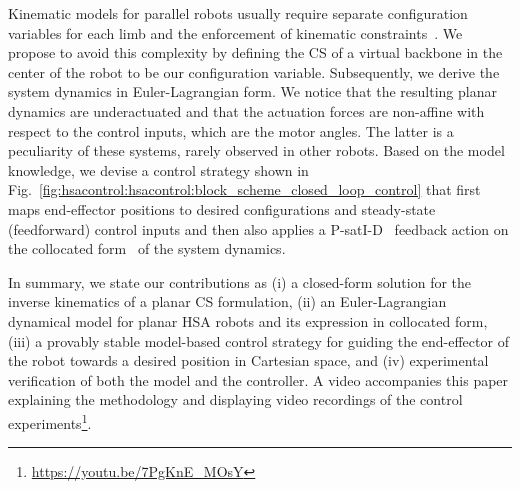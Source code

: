 Kinematic models for parallel robots usually require separate configuration variables for each limb and the enforcement of kinematic constraints~\cite {armanini2021discrete}.
%
We propose to avoid this complexity by %
defining the \gls{CS} of a virtual backbone in the center of the robot to be our configuration variable. %
Subsequently, we derive the system dynamics in Euler-Lagrangian form. We notice that the resulting planar dynamics are underactuated
and that the actuation forces are non-affine with respect to the control inputs, which are the motor angles. The latter is a peculiarity of these systems, rarely observed in other robots.
Based on the model knowledge, we devise a control strategy shown in Fig.~\ref{fig:hsacontrol:hsacontrol:block_scheme_closed_loop_control} that first maps end-effector positions to desired configurations and steady-state (feedforward) control inputs and then 
also applies a P-satI-D~\cite{pustina2022p} feedback action on the collocated form~\cite{pustina2024input} of the system dynamics.

In summary, we state our contributions as (i) a closed-form solution for the inverse kinematics of a planar \gls{CS} formulation, (ii) an Euler-Lagrangian dynamical model for planar \gls{HSA} robots and its expression in collocated form, (iii) a provably stable model-based control strategy for guiding the end-effector of the robot towards a desired position in Cartesian space, and (iv) experimental verification of both the model and the controller. A video accompanies this paper explaining the methodology and displaying video recordings of the control experiments\footnote{\url{https://youtu.be/7PgKnE_MOsY}}.


